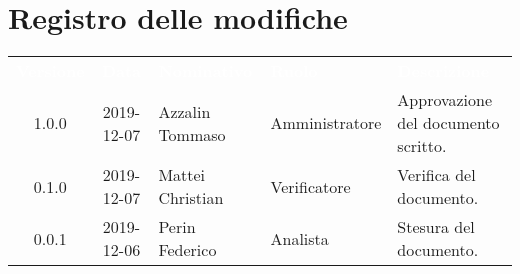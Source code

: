 \section*{Registro delle modifiche}
{
\renewcommand{\arraystretch}{1.5}
\centering
\begin{longtable}{ c c  C{4cm}  C{3cm} C{4cm}}
\textcolor{white}{\textbf{Versione}} & \textcolor{white}{\textbf{Data}} & \textcolor{white}{\textbf{Nominativo}} & \textcolor{white}{\textbf{Ruolo}} & \textcolor{white}{\textbf{Descrizione}}\\	


1.0.0 & 2019-12-07 & Azzalin Tommaso & Amministratore & Approvazione del documento scritto.  \\
		
0.1.0 & 2019-12-07 & Mattei Christian & Verificatore & Verifica del documento.  \\
		
0.0.1 & 2019-12-06 & Perin Federico & Analista & Stesura del documento.  \\
        

\end{longtable}
}